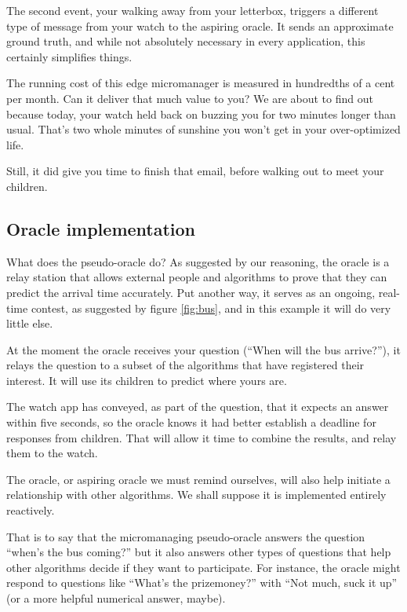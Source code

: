 The second event, your walking away from your letterbox, triggers a different type of message from your watch to the aspiring oracle. It sends an approximate ground truth, and while not absolutely necessary in every application, this certainly simplifies things.   

The running cost of this edge micromanager is measured in hundredths of a cent per month. Can it deliver that much value to you? We are about to find out because today, your watch held back on buzzing you for two minutes longer than usual. That's two whole minutes of sunshine you won't get in your over-optimized life.  

Still, it did give you time to finish that email, before walking out to meet your children. 

\subsection{Oracle implementation}

What does the pseudo-oracle do? As suggested by our reasoning, the oracle is a relay station that allows external people and algorithms to prove that they can predict the arrival time accurately. Put another way, it serves as an ongoing, real-time contest, as suggested by figure \ref{fig:bus}, and in this example it will do very little else. 

At the moment the oracle receives your question (``When will the bus arrive?''), it relays the question to a subset of the algorithms that have registered their interest. It will use its children to predict where yours are.

The watch app has conveyed, as part of the question, that it expects an answer within five seconds, so the oracle knows it had better establish a deadline for responses from children. That will allow it time to combine the results, and relay them to the watch. 


The oracle, or aspiring oracle we must remind ourselves, will also help initiate a relationship with other algorithms. We shall suppose it is implemented entirely reactively.


That is to say that the micromanaging pseudo-oracle answers the question ``when's the bus coming?'' but it also answers other types of questions that help other algorithms decide if they want to participate. For instance, the oracle might respond to questions like ``What's the prizemoney?'' with ``Not much, suck it up'' (or a more helpful numerical answer, maybe).   


